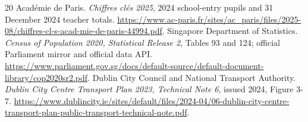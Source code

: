\documentclass[12pt]{article}
\begin{document}
\begin{thebibliography}{20}
 Acad\'emie de Paris. \textit{Chiffres cl\'es 2025},
2024 school-entry pupils and 31 December 2024 teacher totals.
\url{https://www.ac-paris.fr/sites/ac_paris/files/2025-08/chiffres-cl-s-acad-mie-de-paris-44994.pdf}.
 Singapore Department of Statistics. \textit{Census of
Population 2020, Statistical Release 2}, Tables 93 and 124; official Parliament
mirror and official data API.
\url{https://www.parliament.gov.sg/docs/default-source/default-document-library/cop2020sr2.pdf}.
 Dublin City Council and National Transport Authority.
\textit{Dublin City Centre Transport Plan 2023, Technical Note 6},
issued 2024, Figure 3-7.
\url{https://www.dublincity.ie/sites/default/files/2024-04/06-dublin-city-centre-transport-plan-public-transport-technical-note.pdf}.
\CaseReferences
\end{thebibliography}
\end{document}
